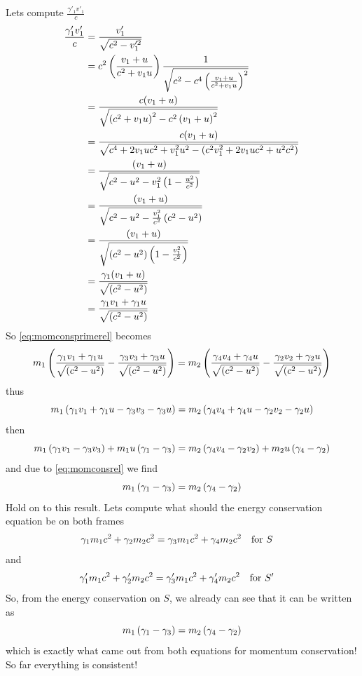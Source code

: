 \documentclass[oneside, 10pt, notitlepage]{book}
\begin{document}
Lets compute \(\frac{\gamma'_1v'_1}{c}\)
\begin{equation}
\begin{split}
    \frac{\gamma'_1v'_1}{c} &= \frac{v'_1}{\sqrt{c^2-v_1^{\prime2}}}\\
    &= c^2\left(\frac{v_1 + u}{c^2 + v_1 u}\right)\frac{1}{\sqrt{c^2 -c^4 \left(\frac{v_1 + u}{c^2 + v_1 u}\right)^2 }} \\
    &= \frac{c(v_1 + u)}{\sqrt{\left(c^2 + v_1 u\right)^2 - c^2\left(v_1 + u\right)^2}} \\
    &= \frac{c(v_1 + u)}{\sqrt{c^4 + 2 v_1 u c^2 + v_1^2 u^2 - \left(c^2v_1^2 + 2 v_1 uc^2 + u^2c^2\right)}} \\
    &= \frac{(v_1 + u)}{\sqrt{c^2 -u^2 - v_1^2\left(1-\frac{u^2}{c^2}\right)}} \\
    &= \frac{(v_1 + u)}{\sqrt{c^2 -u^2 - \frac{v_1^2}{c^2}\left(c^2-u^2\right)}} \\
    &= \frac{(v_1 + u)}{\sqrt{\left(c^2 -u^2\right)\left(1- \frac{v_1^2}{c^2} \right) }} \\
    &= \frac{\gamma_1(v_1 + u)}{\sqrt{\left(c^2 -u^2\right)} } \\
    &= \frac{\gamma_1 v_1 + \gamma_1 u}{\sqrt{\left(c^2 -u^2\right)}}
\end{split}
\end{equation}
So \eqref{eq:momconsprimerel} becomes
\begin{equation}
    m_1 \left(\frac{\gamma_1 v_1 + \gamma_1 u}{\sqrt{\left(c^2 -u^2\right)}}-\frac{\gamma_3 v_3 + \gamma_3 u}{\sqrt{\left(c^2 -u^2\right)}}\right) = m_2 \left(\frac{\gamma_4 v_4 + \gamma_4 u}{\sqrt{\left(c^2 -u^2\right)}}-\frac{\gamma_2 v_2 + \gamma_2 u}{\sqrt{\left(c^2 -u^2\right)}}\right)
\end{equation}
thus
\begin{equation}
    m_1 \left(\gamma_1 v_1 + \gamma_1 u-\gamma_3 v_3 - \gamma_3 u\right) = m_2 \left(\gamma_4 v_4 + \gamma_4 u-\gamma_2 v_2 - \gamma_2 u\right)
\end{equation}
then
\begin{equation}
    m_1\left(\gamma_1 v_1 -\gamma_3 v_3\right) + m_1 u \left(\gamma_1-\gamma_3\right) = m_2\left(\gamma_4 v_4 -\gamma_2 v_2\right) + m_2 u \left(\gamma_4-\gamma_2\right) 
\end{equation}
and due to \eqref{eq:momconsrel} we find
\begin{equation}
    m_1 \left(\gamma_1-\gamma_3\right) = m_2 \left(\gamma_4-\gamma_2\right) 
\end{equation}
Hold on to this result. Lets compute what should the energy conservation equation be on both frames
\begin{equation}
    \gamma_1 m_1 c^2 +\gamma_2 m_2 c^2 = \gamma_3 m_1 c^2 +\gamma_4 m_2 c^2 \qq{for \(S\)}
\end{equation}
and
\begin{equation}
    \gamma'_1 m_1 c^2 +\gamma'_2 m_2 c^2 = \gamma'_3 m_1 c^2 +\gamma'_4 m_2 c^2 \qq{for \(S'\)}
\end{equation}
So, from the energy conservation on \(S\), we already can see that it can be written as
\begin{equation}
    m_1 \left(\gamma_1-\gamma_3\right) = m_2 \left(\gamma_4-\gamma_2\right) 
\end{equation}
which is exactly what came out from both equations for momentum conservation! So far everything is consistent!
\end{document}
